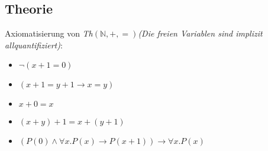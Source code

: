 \subsection{Theorie}
\begin{frame}
  Axiomatisierung von \textit{Th}$(\mathbb{N}, +, =)$\textit{(Die freien Variablen sind implizit allquantifiziert)}:
  \begin{itemize}[<+->]
    \item $\neg{(x + 1 = 0)}$
    \item $(x + 1 = y + 1 \to x = y)$
    \item $x + 0 = x$
    \item $(x + y) + 1 = x + (y + 1)$ \\
    \item
      $(P(0) \land \forall x . {P(x) \to P(x + 1)}) \to \forall x . P(x)$
  \end{itemize}
\end{frame}


